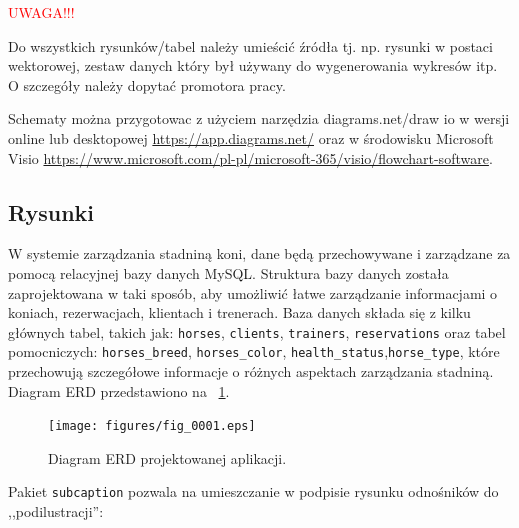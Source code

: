 \noindent \textcolor{red}{\Large UWAGA!!!}

Do wszystkich rysunków/tabel należy umieścić źródła tj. np. rysunki w postaci wektorowej, zestaw danych który był używany do wygenerowania wykresów itp. O szczegóły należy dopytać promotora pracy.


Schematy można przygotowac z użyciem narzędzia diagrams.net/draw io w wersji online lub desktopowej \url{https://app.diagrams.net/} oraz w środowisku Microsoft Visio \url{https://www.microsoft.com/pl-pl/microsoft-365/visio/flowchart-software}.
 
\subsection{Rysunki}

W systemie zarządzania stadniną koni, dane będą przechowywane i zarządzane za pomocą relacyjnej bazy danych MySQL. Struktura bazy danych została zaprojektowana w taki sposób, aby umożliwić łatwe zarządzanie informacjami o koniach, rezerwacjach, klientach i trenerach. Baza danych składa się z kilku głównych tabel, takich jak: \texttt{horses}, \texttt{clients}, \texttt{trainers}, \texttt{reservations} oraz tabel pomocniczych: \texttt{horses\_breed}, \texttt{horses\_color}, \texttt{health\_status},\texttt{horse\_type}, które przechowują szczegółowe informacje o różnych aspektach zarządzania stadniną. Diagram ERD przedstawiono na \figurename~\ref{fig1}.


\begin{figure}[H]
    \centering
    \texttt{[image: figures/fig\_0001.eps]}\\
    \caption{Diagram ERD projektowanej aplikacji.\label{fig1}}
\end{figure}

\newpage
Pakiet \texttt{subcaption} pozwala na umieszczanie w podpisie rysunku odnośników do ,,podilustracji'':

